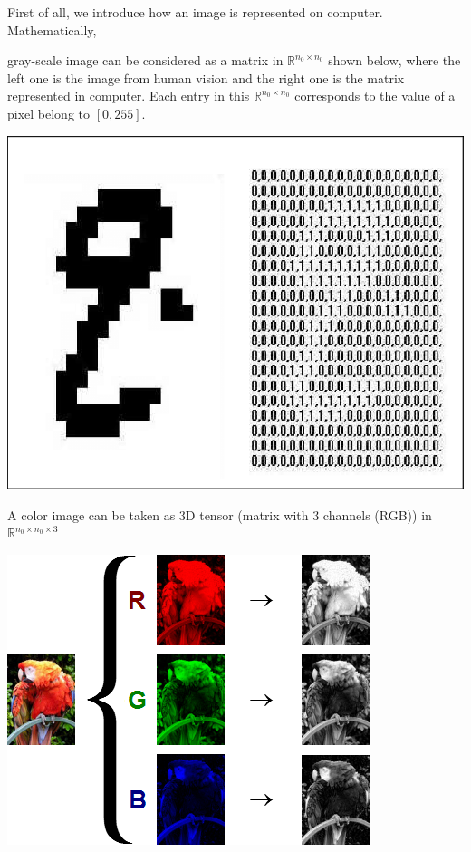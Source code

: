 First of all, we introduce how an image is represented on computer. Mathematically, {gray-scale image can be considered as a matrix  in $ \mathbb{R}^{n_0\times n_0}$ shown below, where the left one is the image from human vision and the right one is the matrix represented in computer. Each entry in this $ \mathbb{R}^{n_0\times n_0}$ corresponds to the value of a pixel belong to $[0,255]$.
	\begin{center}
		\includegraphics[width=.4\textwidth, height=.2\textheight]{6DL/figures/gray-1.png}
	\end{center}
	
	A color image can be taken as 3D tensor (matrix with $3$ channels (RGB)) in $ \mathbb{R}^{n_0\times n_0 \times 3}$
	\begin{center}
		\includegraphics[width=.4\textwidth, height=.2\textheight]{6DL/figures/corlor-1.png}
	\end{center}	
	\break
	
}
